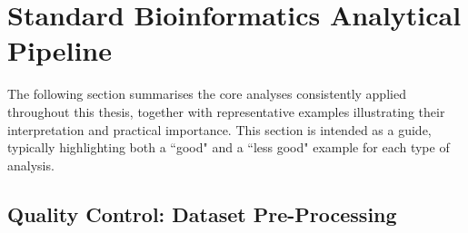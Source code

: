 \section{Standard Bioinformatics Analytical Pipeline}

The following section summarises the core analyses consistently applied throughout this thesis, together with representative examples illustrating their interpretation and practical importance. This section is intended as a guide, typically highlighting both a ``good" and a ``less good" example for each type of analysis.

\subsection{Quality Control: Dataset Pre-Processing}

